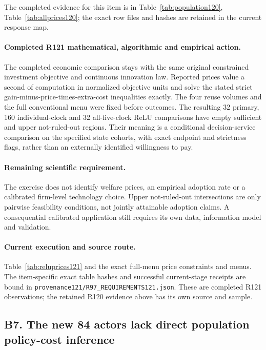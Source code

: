 The completed evidence for this item is in Table~\ref{tab:population120}, Table~\ref{tab:allprices120}; the exact row files and hashes are retained in the current response map.

\paragraph{Completed R121 mathematical, algorithmic and empirical action.}
The completed economic comparison stays with the same original constrained investment objective and continuous innovation law. Reported prices value a second of computation in normalized objective units and solve the stated strict gain-minus-price-times-extra-cost inequalities exactly. The four reuse volumes and the full conventional menu were fixed before outcomes. The resulting 32 primary, 160 individual-clock and 32 all-five-clock ReLU comparisons have empty sufficient and upper not-ruled-out regions. Their meaning is a conditional decision-service comparison on the specified state cohorts, with exact endpoint and strictness flags, rather than an externally identified willingness to pay.

\paragraph{Remaining scientific requirement.}
The exercise does not identify welfare prices, an empirical adoption rate or a calibrated firm-level technology choice. Upper not-ruled-out intersections are only pairwise feasibility conditions, not jointly attainable adoption claims. A consequential calibrated application still requires its own data, information model and validation.

\paragraph{Current execution and source route.}
Table~\ref{tab:reluprices121} and the exact full-menu price constraints and menus.
The item-specific exact table hashes and successful current-stage receipts are bound in \nolinkurl{provenance121/R97_REQUIREMENTS121.json}. These are completed R121 observations; the retained R120 evidence above has its own source and sample.

\subsection{B7. The new 84 actors lack direct population policy-cost inference}
\label{response121:B7}

